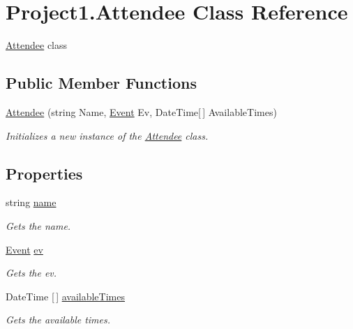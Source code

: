 \hypertarget{classProject1_1_1Attendee}{}\section{Project1.\+Attendee Class Reference}
\label{classProject1_1_1Attendee}


\hyperlink{classProject1_1_1Attendee}{Attendee} class  


\subsection*{Public Member Functions}
\begin{DoxyCompactItemize}
\item 
\hyperlink{classProject1_1_1Attendee_a63d1deb773834c121c3689a7d85265b9}{Attendee} (string Name, \hyperlink{classProject1_1_1Event}{Event} Ev, Date\+Time\mbox{[}$\,$\mbox{]} Available\+Times)
\begin{DoxyCompactList}\small\item\em Initializes a new instance of the \hyperlink{classProject1_1_1Attendee}{Attendee} class. \end{DoxyCompactList}\end{DoxyCompactItemize}
\subsection*{Properties}
\begin{DoxyCompactItemize}
\item 
string \hyperlink{classProject1_1_1Attendee_a5ccf26d80354941e9c4a80157b9fb6c9}{name}
\begin{DoxyCompactList}\small\item\em Gets the name. \end{DoxyCompactList}\item 
\hyperlink{classProject1_1_1Event}{Event} \hyperlink{classProject1_1_1Attendee_ad47df6573b4cb7b6dbd6ae35751abdc2}{ev}
\begin{DoxyCompactList}\small\item\em Gets the ev. \end{DoxyCompactList}\item 
Date\+Time \mbox{[}$\,$\mbox{]} \hyperlink{classProject1_1_1Attendee_a41af27c6b1dbd1aa8e2ad78870a956a0}{available\+Times}
\begin{DoxyCompactList}\small\item\em Gets the available times. \end{DoxyCompactList}\end{DoxyCompactItemize}


